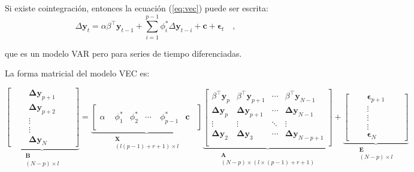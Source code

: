 Si existe cointegración, entonces la ecuación (\ref{eq:vec}) puede ser escrita:
\begin{equation}
 \label{eq:vecfull}
  \Delta \mathbf{y}_t = \alpha \beta^\intercal\mathbf{y}_{t-1} 
   + \sum_{i=1}^{p-1} \phi_i^*\Delta
   \mathbf{y}_{t-i}  + \mathbf{c} + \mathbf{\epsilon}_t \quad ,
   \end{equation}

   \noindent que es un modelo VAR pero para series de tiempo diferenciadas.

La forma matricial del modelo VEC es:

\begin{equation} \label{eq:vecmatrix}
\underbrace{
                \left[ \begin{array}{ccc}
               \quad & \mathbf{\Delta y}_{p+1} & \quad \\ 
               \quad & \mathbf{\Delta y}_{p+2} & \quad \\
               \quad & \vdots & \quad \\ 
               \quad & \vdots & \quad \\  
               \quad & \mathbf{\Delta y}_N & \quad 
               \end{array} \right]}_{\substack{\mathbf{B}\\ (N-p) \times l }} =
   \underbrace{\left[ 
    \begin{array}{cccccc}
     \quad & \quad & \quad & \quad & \quad & \quad \\
     \alpha & \phi_1^*  & \phi_2^* & \cdots & \phi_{p-1}^* & \mathbf{c} \\  
     \quad &\quad &\quad & \quad & \quad & \quad
     \end{array} 
      \right]}_{\substack{ \mathbf{X}\\ (l(p-1)+r+1) \times l}}
\underbrace{\begin{bmatrix} 
   \beta^\intercal \mathbf{y}_{p} & 
   \beta^\intercal \mathbf{y}_{p+1}&
   \cdots & \beta^\intercal \mathbf{y}_{N-1} \\
   \mathbf{\Delta y}_p & \mathbf{\Delta y}_{p+1} & \cdots 
   & \mathbf{\Delta y}_{N-1} \\ 
   \vdots & \vdots & \ddots & \vdots \\
   \mathbf{\Delta y}_2 & \mathbf{\Delta y}_{3} & \cdots 
   & \mathbf{\Delta y}_{N-p+1} \\ 
   \end{bmatrix}}_{\substack{\mathbf{A} \\ (N-p) \times (l \times (p-1)+r+1) }}
+
\underbrace{\begin{bmatrix}
              \quad &\mathbf{\epsilon}_{p+1} & \quad \\ 
              \quad &\vdots & \quad\\ 
              \quad & \vdots & \quad\\
              \quad & \vdots & \quad\\
              \quad &\mathbf{\epsilon}_N & \quad
             \end{bmatrix}}_{\substack{\mathbf{E}\\ (N-p) \times l }} 
\end{equation}


